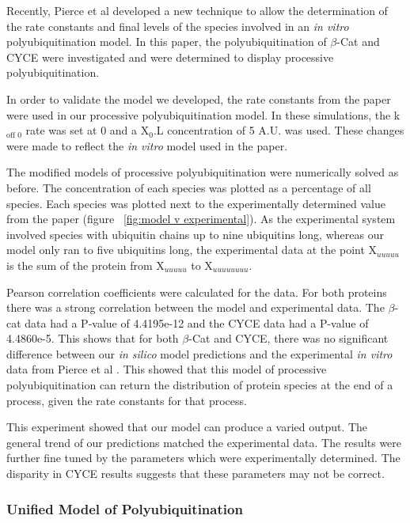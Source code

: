 \documentclass[11pt]{article}
\begin{document}
Recently, Pierce et al \cite{pierce2009detection} developed a new technique to allow the determination of the rate constants and final levels of the species involved in an \emph{in vitro} polyubiquitination model. In this paper, the polyubiquitination of $\beta$-Cat and CYCE were investigated and were determined to display processive polyubiquitination. 

In order to validate the model we developed, the rate constants from the paper were used in our processive polyubiquitination model. In these simulations, the k$_\text{off 0}$ rate was set at 0 and a X$_0$.L concentration of 5 A.U. was used. These changes were made to reflect the \emph{in vitro} model used in the paper.

The modified models of processive polyubiquitination were numerically solved as before. The concentration of each species was plotted as a percentage of all species. Each species was plotted next to the experimentally determined value from the paper (figure ~\ref{fig:model v experimental}).  As the experimental system involved species with ubiquitin chains up to nine ubiquitins long, whereas our model only ran to five ubiquitins long, the experimental data at the point X$_{uuuuu}$ is the sum of the protein from X$_{uuuuu}$ to X$_{uuuuuuuu}$.

Pearson correlation coefficients\cite{pearson} were calculated for the data. For both proteins there was a strong correlation between the model and experimental data. The $\beta$-cat data had a P-value of 4.4195e-12 and the CYCE data had a P-value of 4.4860e-5. This shows that for both $\beta$-Cat and CYCE, there was no significant difference between our \emph{in silico} model predictions and the experimental \emph{in vitro} data from Pierce et al \cite{pierce2009detection}. This showed that this model of processive polyubiquitination can return the distribution of protein species at the end of a process, given the rate constants for that process.

This experiment showed that our model can produce a varied output. The general trend of our predictions matched the experimental data. The results were further fine tuned by the parameters which were experimentally determined. The disparity in CYCE results suggests that these parameters may not be correct.

\subsubsection{Unified Model of Polyubiquitination}\label{unifed}
\end{document}
